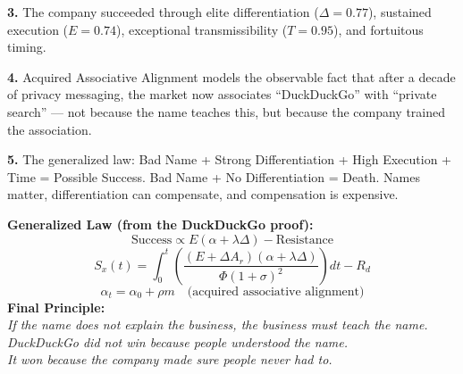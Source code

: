 \documentclass[12pt, openany]{book}
\theoremstyle{thmstyle}
\theoremstyle{defstyle}
\begin{document}
\textbf{3.} The company succeeded through elite differentiation ($\Delta = 0.77$), sustained execution ($E = 0.74$), exceptional transmissibility ($T = 0.95$), and fortuitous timing.

\textbf{4.} Acquired Associative Alignment models the observable fact that after a decade of privacy messaging, the market now associates ``DuckDuckGo'' with ``private search'' --- not because the name teaches this, but because the company trained the association.

\textbf{5.} The generalized law: Bad Name + Strong Differentiation + High Execution + Time = Possible Success. Bad Name + No Differentiation = Death. Names matter, differentiation can compensate, and compensation is expensive.

\begin{equationbox}
\textbf{Generalized Law (from the DuckDuckGo proof):}
\[
\text{Success} \propto E(\alpha + \lambda\Delta) - \text{Resistance}
\]
\[
S_x(t) = \int_0^t \left(\frac{(E + \Delta A_r)(\alpha + \lambda\Delta)}{\Phi(1+\sigma)^2}\right) dt - R_d
\]
\[
\alpha_t = \alpha_0 + \rho m \quad \text{(acquired associative alignment)}
\]
\textbf{Final Principle:}\\
\textit{If the name does not explain the business, the business must teach the name.\\
DuckDuckGo did not win because people understood the name.\\
It won because the company made sure people never had to.}
\end{equationbox}
\end{document}
